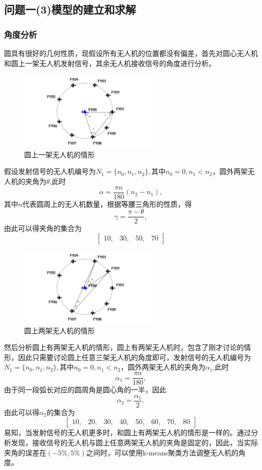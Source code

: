 \documentclass[withoutpreface,bwprint]{cumcmthesis} %
\begin{document}
\subsection{问题一(3)模型的建立和求解}
\subsubsection{角度分析}
圆具有很好的几何性质，现假设所有无人机的位置都没有偏差，首先对圆心无人机和圆上一架无人机发射信号，其余无人机接收信号的角度进行分析。
\begin{figure}[H]
	\centering
	\includegraphics[width=0.6\textwidth]{6}
	\caption{圆上一架无人机的情形}
	\label{6}
\end{figure}
假设发射信号的无人机编号为$N_1=\{ n_{0},n_{1},n_{2}\},$其中$n_0=0,n_1<n_2$，圆外两架无人机的夹角为$\theta$,此时$$\alpha = \frac{\pi n}{180} (n_2-n_1),$$其中$n$代表圆周上的无人机数量，根据等腰三角形的性质，得$$\gamma=\frac{\pi-\theta}{2},$$由此可以得夹角的集合为$$\begin{bmatrix}
	10 ,& 30, & 50, & 70
\end{bmatrix}$$
\begin{figure}[H]
	\centering
	\includegraphics[width=0.6\textwidth]{7}
	\caption{圆上两架无人机的情形}
	\label{7}
\end{figure}
然后分析圆上有两架无人机的情形，圆上有两架无人机时，包含了刚才讨论的情形，因此只需要讨论圆上任意三架无人机的角度即可，发射信号的无人机编号为$N_1=\{ n_{0},n_{1},n_{2}\},$其中$n_0=0,n_1<n_2$，圆外两架无人机的夹角为$\alpha_1$,此时$$\alpha_1 = \frac{\pi n}{180},$$由于同一段弧长对应的圆周角是圆心角的一半，因此
$$\alpha_2 = \frac{\alpha_1}{2},$$由此可以得$\alpha_2$的集合为$$\begin{bmatrix}
10 ,& 20, & 30,& 40,& 50 ,& 60,&70, &80
\end{bmatrix}$$
易知，当发射信号的无人机更多时，和圆上有两架无人机的情形是一样的。通过分析发现，接收信号的无人机与圆上任意两架无人机的夹角是固定的，因此，当实际夹角的误差在$(-5\%,5\%)$之间时，可以使用k-means聚类方法调整无人机的角度。
\end{document}
